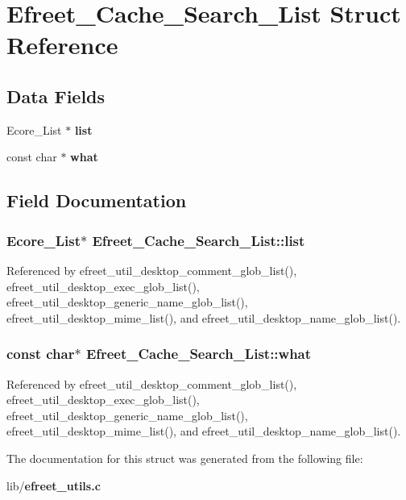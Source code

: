 \section{Efreet\_\-Cache\_\-Search\_\-List Struct Reference}
\label{structEfreet__Cache__Search__List}
\subsection*{Data Fields}
\begin{CompactItemize}
\item 
Ecore\_\-List $\ast$ {\bf list}
\item 
const char $\ast$ {\bf what}
\end{CompactItemize}


\subsection{Field Documentation}
\subsubsection{\setlength{\rightskip}{0pt plus 5cm}Ecore\_\-List$\ast$ {\bf Efreet\_\-Cache\_\-Search\_\-List::list}}\label{structEfreet__Cache__Search__List_540358cecb676129e801ad8282242a9f}




Referenced by efreet\_\-util\_\-desktop\_\-comment\_\-glob\_\-list(), efreet\_\-util\_\-desktop\_\-exec\_\-glob\_\-list(), efreet\_\-util\_\-desktop\_\-generic\_\-name\_\-glob\_\-list(), efreet\_\-util\_\-desktop\_\-mime\_\-list(), and efreet\_\-util\_\-desktop\_\-name\_\-glob\_\-list().
\subsubsection{\setlength{\rightskip}{0pt plus 5cm}const char$\ast$ {\bf Efreet\_\-Cache\_\-Search\_\-List::what}}\label{structEfreet__Cache__Search__List_532d1967d5a7ec19772db3eda8d1ade6}




Referenced by efreet\_\-util\_\-desktop\_\-comment\_\-glob\_\-list(), efreet\_\-util\_\-desktop\_\-exec\_\-glob\_\-list(), efreet\_\-util\_\-desktop\_\-generic\_\-name\_\-glob\_\-list(), efreet\_\-util\_\-desktop\_\-mime\_\-list(), and efreet\_\-util\_\-desktop\_\-name\_\-glob\_\-list().

The documentation for this struct was generated from the following file:\begin{CompactItemize}
\item 
lib/{\bf efreet\_\-utils.c}\end{CompactItemize}
